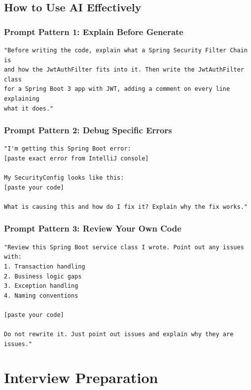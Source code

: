 \documentclass[12pt,a4paper]{report}
\begin{document}
\section{How to Use AI Effectively}

\subsection{Prompt Pattern 1: Explain Before Generate}
\begin{lstlisting}[style=bashstyle,caption=Effective AI Prompt for Learning]
"Before writing the code, explain what a Spring Security Filter Chain is
and how the JwtAuthFilter fits into it. Then write the JwtAuthFilter class
for a Spring Boot 3 app with JWT, adding a comment on every line explaining
what it does."
\end{lstlisting}

\subsection{Prompt Pattern 2: Debug Specific Errors}
\begin{lstlisting}[style=bashstyle,caption=Debugging Prompt]
"I'm getting this Spring Boot error:
[paste exact error from IntelliJ console]

My SecurityConfig looks like this:
[paste your code]

What is causing this and how do I fix it? Explain why the fix works."
\end{lstlisting}

\subsection{Prompt Pattern 3: Review Your Own Code}
\begin{lstlisting}[style=bashstyle,caption=Code Review Prompt]
"Review this Spring Boot service class I wrote. Point out any issues with:
1. Transaction handling
2. Business logic gaps
3. Exception handling
4. Naming conventions

[paste your code]

Do not rewrite it. Just point out issues and explain why they are issues."
\end{lstlisting}

\chapter{Interview Preparation}
\end{document}

